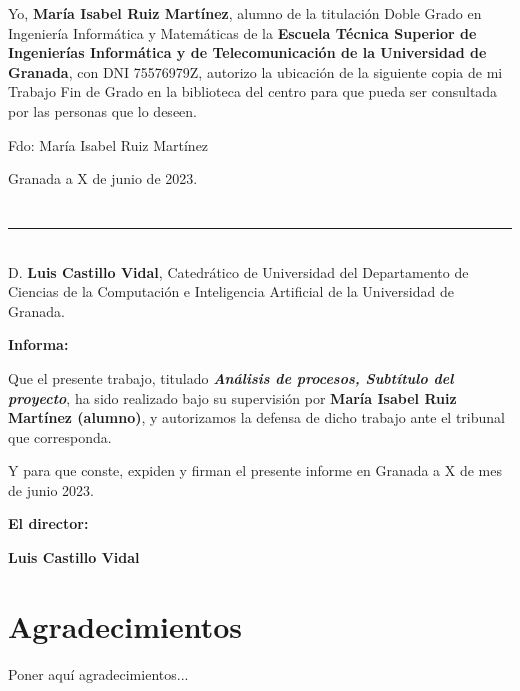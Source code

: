 Yo, \textbf{María Isabel Ruiz Martínez}, alumno de la titulación Doble Grado en Ingeniería Informática y Matemáticas de la \textbf{Escuela Técnica Superior
de Ingenierías Informática y de Telecomunicación de la Universidad de Granada}, con DNI 75576979Z, autorizo la
ubicación de la siguiente copia de mi Trabajo Fin de Grado en la biblioteca del centro para que pueda ser
consultada por las personas que lo deseen.

\vspace{6cm}

\noindent Fdo: María Isabel Ruiz Martínez

\vspace{2cm}

\begin{flushright}
Granada a X de junio de 2023.
\end{flushright}


\chapter*{}
\thispagestyle{empty}

\noindent\rule[-1ex]{\textwidth}{2pt}\\[4.5ex]

D. \textbf{Luis Castillo Vidal}, Catedrático de Universidad del Departamento de Ciencias de la Computación e Inteligencia Artificial de la Universidad de Granada.




\vspace{0.5cm}

\textbf{Informa:}

\vspace{0.5cm}

Que el presente trabajo, titulado \textit{\textbf{Análisis de procesos, Subtítulo del proyecto}},
ha sido realizado bajo su supervisión por \textbf{María Isabel Ruiz Martínez (alumno)}, y autorizamos la defensa de dicho trabajo ante el tribunal
que corresponda.

\vspace{0.5cm}

Y para que conste, expiden y firman el presente informe en Granada a X de mes de junio 2023.

\vspace{1cm}

\textbf{El director:}

\vspace{5cm}

\noindent \textbf{Luis Castillo Vidal}

\chapter*{Agradecimientos}
\thispagestyle{empty}

       \vspace{1cm}


Poner aquí agradecimientos...


